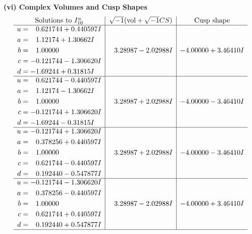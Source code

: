 \documentclass[1p]{elsarticle_modified}
\theoremstyle{definition}
\newcommand{\I}{\sqrt{-1}}
\begin{document}
\newpage\flushleft \textbf{(vi) Complex Volumes and Cusp Shapes}
$$\begin{array}{c|c|c}  
\text{Solutions to }I^u_{10}& \I (\text{vol} + \sqrt{-1}CS) & \text{Cusp shape}\\
 \hline 
\begin{aligned}
u &= \phantom{-}0.621744 + 0.440597 I \\
a &= \phantom{-}1.12174 + 1.30662 I \\
b &= \phantom{-}1.00000\phantom{ +0.000000I} \\
c &= -0.121744 - 1.306620 I \\
d &= -1.69244 + 0.31815 I\end{aligned}
 & \phantom{-}3.28987 - 2.02988 I & -4.00000 + 3.46410 I \\ \hline\begin{aligned}
u &= \phantom{-}0.621744 - 0.440597 I \\
a &= \phantom{-}1.12174 - 1.30662 I \\
b &= \phantom{-}1.00000\phantom{ +0.000000I} \\
c &= -0.121744 + 1.306620 I \\
d &= -1.69244 - 0.31815 I\end{aligned}
 & \phantom{-}3.28987 + 2.02988 I & -4.00000 - 3.46410 I \\ \hline\begin{aligned}
u &= -0.121744 + 1.306620 I \\
a &= \phantom{-}0.378256 + 0.440597 I \\
b &= \phantom{-}1.00000\phantom{ +0.000000I} \\
c &= \phantom{-}0.621744 - 0.440597 I \\
d &= \phantom{-}0.192440 - 0.547877 I\end{aligned}
 & \phantom{-}3.28987 + 2.02988 I & -4.00000 - 3.46410 I \\ \hline\begin{aligned}
u &= -0.121744 - 1.306620 I \\
a &= \phantom{-}0.378256 - 0.440597 I \\
b &= \phantom{-}1.00000\phantom{ +0.000000I} \\
c &= \phantom{-}0.621744 + 0.440597 I \\
d &= \phantom{-}0.192440 + 0.547877 I\end{aligned}
 & \phantom{-}3.28987 - 2.02988 I & -4.00000 + 3.46410 I\\
 \hline 
 \end{array}$$\newpage\newpage\renewcommand{\arraystretch}{1}
\end{document}
